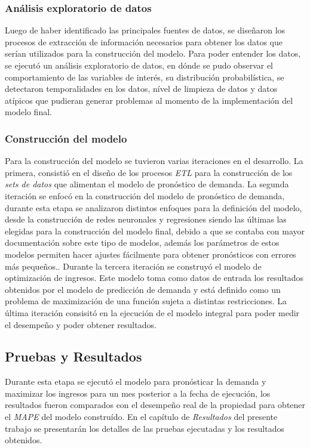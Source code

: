 \subsubsection*{Análisis exploratorio de datos}

Luego de haber identificado las principales fuentes de datos, se diseñaron los procesos de extracción de información necesarios para obtener los datos que serían utilizados para la construcción del modelo. Para poder entender los datos, se ejecutó un análisis exploratorio de datos, en dónde se pudo observar el comportamiento de las variables de interés, su distribución probabilística, se detectaron temporalidades en los datos, nível de limpieza de datos y datos atípicos que pudieran generar problemas al momento de la implementación del modelo final.

\subsubsection*{Construcción del modelo}

Para la construcción del modelo se tuvieron varias iteraciones en el desarrollo. La primera, consistió en el diseño de los procesos \emph{ETL} para la construcción de los \emph{sets de datos} que alimentan el modelo de pronóstico de demanda. La segunda iteración se enfocó en la construcción del modelo de pronóstico de demanda, durante esta etapa se analizaron distintos enfoques para la definición del modelo, desde la construcción de redes neuronales y regresiones siendo las últimas las elegidas para la construcción del modelo final, debido a que se contaba con mayor documentación sobre este tipo de modelos, además los parámetros de estos modelos permiten hacer ajustes fácilmente para obtener pronósticos con errores más pequeños.. Durante la tercera iteración se construyó el modelo de optimización de ingresos. Este modelo toma como datos de entrada los resultados obtenidos por el modelo de predicción de demanda y está definido como un problema de maximización de una función sujeta a distintas restricciones. La última iteración consisitó en la ejecución de el modelo integral para poder medir el desempeño y poder obtener resultados.

\subsection*{Pruebas y Resultados}

Durante esta etapa se ejecutó el modelo para pronósticar la demanda y maximizar los ingresos para un mes posterior a la fecha de ejecución, los resultados fueron comparados con el desempeño real de la propiedad para obtener el \emph{MAPE} del modelo construído. En el capítulo de \emph{Resultados} del presente trabajo se presentarán los detalles de las pruebas ejecutadas y los resultados obtenidos.
